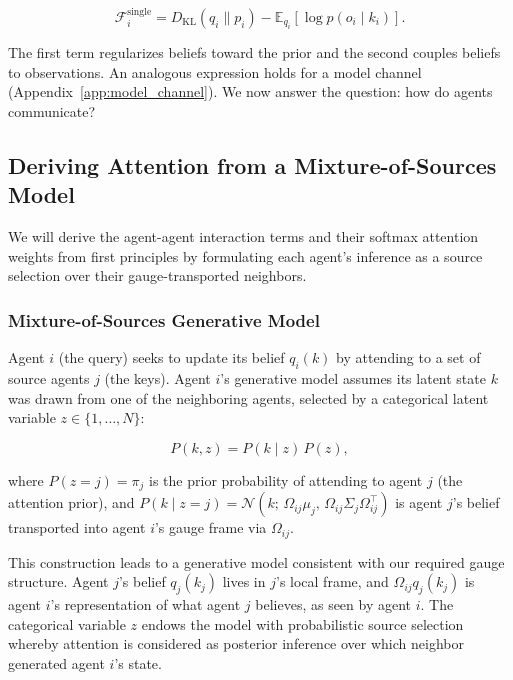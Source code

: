 \documentclass[twoside,11pt]{article}
\begin{document}
\begin{equation}
\mathcal{F}_i^{\text{single}} = D_{\mathrm{KL}}(q_i \| p_i) - \mathbb{E}_{q_i}[\log p(o_i \mid k_i)].
\label{eq:single_agent_fep}
\end{equation}

The first term regularizes beliefs toward the prior and the second couples beliefs to observations. An analogous expression holds for a model channel (Appendix~\ref{app:model_channel}). We now answer the question: how do agents communicate?

\subsection{Deriving Attention from a Mixture-of-Sources Model}
\label{sec:mixture_derivation}

We will derive the agent-agent interaction terms and their softmax attention weights from first principles by formulating each agent's inference as a source selection over their gauge-transported neighbors.

\subsubsection{Mixture-of-Sources Generative Model}

Agent $i$ (the query) seeks to update its belief $q_i(k)$ by attending to a set of source agents $j$ (the keys). Agent $i$'s generative model assumes its latent state $k$ was drawn from one of the neighboring agents, selected by a categorical latent variable $z \in \{1, \ldots, N\}$:

\begin{equation}
P(k, z) = P(k \mid z)\, P(z),
\label{eq:mixture_joint}
\end{equation}

where $P(z = j) = \pi_j$ is the prior probability of attending to agent $j$ (the attention prior), and $P(k \mid z = j) = \mathcal{N}(k;\, \Omega_{ij}\mu_j,\, \Omega_{ij}\Sigma_j\Omega_{ij}^\top)$ is agent $j$'s belief transported into agent $i$'s gauge frame via $\Omega_{ij}$.

This construction leads to a generative model consistent with our required gauge structure. Agent $j$'s belief $q_j(k_j)$ lives in $j$'s local frame, and $\Omega_{ij}q_j(k_j)$ is agent $i$'s representation of what agent $j$ believes, as seen by agent $i$. The categorical variable $z$ endows the model with probabilistic source selection whereby attention is considered as posterior inference over which neighbor generated agent $i$'s state.
\end{document}
